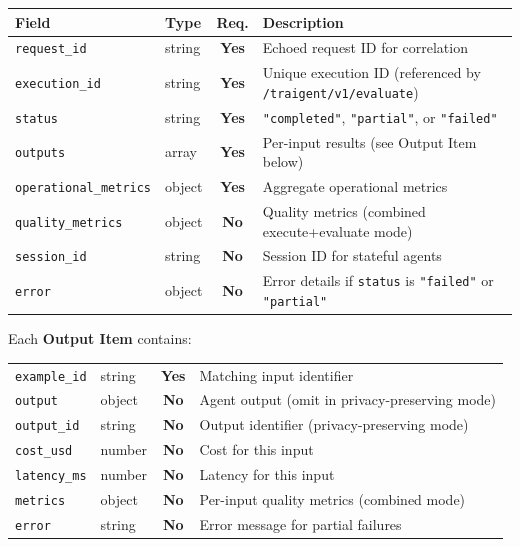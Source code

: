 \documentclass[11pt,a4paper]{article}
\newcommand{\field}[1]{\texttt{#1}}
\newcommand{\required}{\textbf{Yes}}
\newcommand{\optional}{\textbf{No}}
\newcommand{\status}[1]{\texttt{"#1"}}
\begin{document}
\begin{center}\small
\begin{tabularx}{\textwidth}{@{}llcX@{}}
\toprule
\textbf{Field} & \textbf{Type} & \textbf{Req.} & \textbf{Description} \\
\midrule
\field{request\_id}          & string & \required & Echoed request ID for correlation \\
\field{execution\_id}        & string & \required & Unique execution ID (referenced by \texttt{/traigent/v1/evaluate}) \\
\field{status}               & string & \required & \status{completed}, \status{partial}, or \status{failed} \\
\field{outputs}              & array  & \required & Per-input results (see Output Item below) \\
\field{operational\_metrics} & object & \required & Aggregate operational metrics \\
\field{quality\_metrics}     & object & \optional & Quality metrics (combined execute+evaluate mode) \\
\field{session\_id}          & string & \optional & Session ID for stateful agents \\
\field{error}                & object & \optional & Error details if \field{status} is \status{failed} or \status{partial} \\
\bottomrule
\end{tabularx}
\end{center}

Each \textbf{Output Item} contains:

\begin{center}\small
\begin{tabularx}{\textwidth}{@{}llcX@{}}
\toprule
\field{example\_id}   & string & \required & Matching input identifier \\
\field{output}      & object & \optional & Agent output (omit in privacy-preserving mode) \\
\field{output\_id}  & string & \optional & Output identifier (privacy-preserving mode) \\
\field{cost\_usd}   & number & \optional & Cost for this input \\
\field{latency\_ms} & number & \optional & Latency for this input \\
\field{metrics}     & object & \optional & Per-input quality metrics (combined mode) \\
\field{error}       & string & \optional & Error message for partial failures \\
\bottomrule
\end{tabularx}
\end{center}
\end{document}

